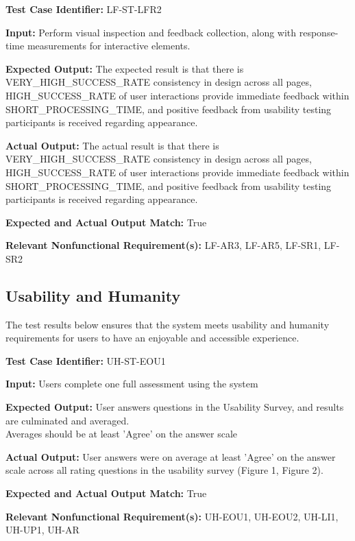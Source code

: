 \documentclass[12pt, titlepage]{article}
\begin{document}
\begin{mdframed}[linewidth=0.5mm] \par
  \textbf{Test Case Identifier:} LF-ST-LFR2 \par
  \textbf{Input:} Perform visual inspection and feedback collection, along with response-time measurements for interactive elements. \par
  \textbf{Expected Output:} The expected result is that there is \\VERY\_HIGH\_SUCCESS\_RATE consistency in design across all pages, \\HIGH\_SUCCESS\_RATE of user interactions provide immediate feedback within SHORT\_PROCESSING\_TIME, and positive feedback from usability testing participants is received regarding appearance. \par
  \textbf{Actual Output:} The actual result is that there is \\VERY\_HIGH\_SUCCESS\_RATE consistency in design across all pages, \\HIGH\_SUCCESS\_RATE of user interactions provide immediate feedback within SHORT\_PROCESSING\_TIME, and positive feedback from usability testing participants is received regarding appearance. \par
  \textbf{Expected and Actual Output Match:} True \par
  \textbf{Relevant Nonfunctional Requirement(s):} LF-AR3, LF-AR5, LF-SR1, LF-SR2
\end{mdframed}
		
\newpage{}

\subsection{Usability and Humanity}
\hspace{2em}The test results below ensures that the system meets usability and humanity
requirements for users to have an enjoyable and accessible experience.

\begin{mdframed}[linewidth=0.5mm] \par
  \textbf{Test Case Identifier:} UH-ST-EOU1 \par
  \textbf{Input:} Users complete one full assessment using the system \par
  \textbf{Expected Output:} User answers questions in the Usability Survey, and results are culminated and averaged.\\
  Averages should be at least 'Agree' on the answer scale \par
  \textbf{Actual Output:} User answers were on average at least 'Agree' on the answer scale across all rating questions in the usability survey (Figure 1, Figure 2).\par
  \textbf{Expected and Actual Output Match:} True \par
  \textbf{Relevant Nonfunctional Requirement(s):} UH-EOU1, UH-EOU2, UH-LI1, UH-UP1, UH-AR
\end{mdframed}
\end{document}
